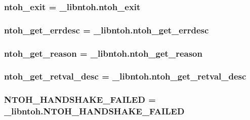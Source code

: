 \hypertarget{namespacelibntoh_a50419ae251d877a1ff9d45d460a306cb}{
\subsubsection[{ntoh\-\_\-exit}]{\setlength{\rightskip}{0pt plus 5cm}ntoh\-\_\-exit = \-\_\-libntoh.\-ntoh\-\_\-exit}}\label{namespacelibntoh_a50419ae251d877a1ff9d45d460a306cb}
\hypertarget{namespacelibntoh_afc942c21c72dbde6e93b31b7d65e4cd0}{
\subsubsection[{ntoh\-\_\-get\-\_\-errdesc}]{\setlength{\rightskip}{0pt plus 5cm}ntoh\-\_\-get\-\_\-errdesc = \-\_\-libntoh.\-ntoh\-\_\-get\-\_\-errdesc}}\label{namespacelibntoh_afc942c21c72dbde6e93b31b7d65e4cd0}
\hypertarget{namespacelibntoh_a971f1fc699a26a9f2b5f461a598f35bd}{
\subsubsection[{ntoh\-\_\-get\-\_\-reason}]{\setlength{\rightskip}{0pt plus 5cm}ntoh\-\_\-get\-\_\-reason = \-\_\-libntoh.\-ntoh\-\_\-get\-\_\-reason}}\label{namespacelibntoh_a971f1fc699a26a9f2b5f461a598f35bd}
\hypertarget{namespacelibntoh_a7329cced91f50574307075bdfb61735b}{
\subsubsection[{ntoh\-\_\-get\-\_\-retval\-\_\-desc}]{\setlength{\rightskip}{0pt plus 5cm}ntoh\-\_\-get\-\_\-retval\-\_\-desc = \-\_\-libntoh.\-ntoh\-\_\-get\-\_\-retval\-\_\-desc}}\label{namespacelibntoh_a7329cced91f50574307075bdfb61735b}
\hypertarget{namespacelibntoh_a2b7441bfc6d1c807b5f4dfe0bd9b4567}{
\subsubsection[{N\-T\-O\-H\-\_\-\-H\-A\-N\-D\-S\-H\-A\-K\-E\-\_\-\-F\-A\-I\-L\-E\-D}]{\setlength{\rightskip}{0pt plus 5cm}N\-T\-O\-H\-\_\-\-H\-A\-N\-D\-S\-H\-A\-K\-E\-\_\-\-F\-A\-I\-L\-E\-D = \-\_\-libntoh.\-N\-T\-O\-H\-\_\-\-H\-A\-N\-D\-S\-H\-A\-K\-E\-\_\-\-F\-A\-I\-L\-E\-D}}\label{namespacelibntoh_a2b7441bfc6d1c807b5f4dfe0bd9b4567}
